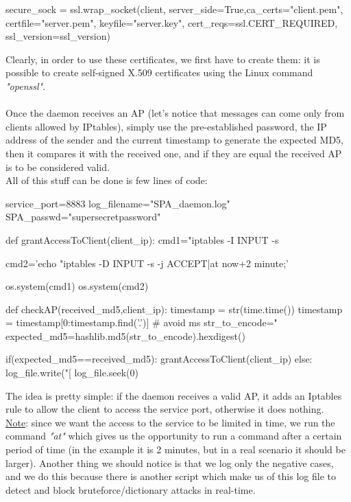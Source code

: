 \documentclass[12pt]{report}
\begin{document}
{\begin{python}
secure_sock = ssl.wrap_socket(client, server_side=True,ca_certs="client.pem",
                               certfile="server.pem",
                               keyfile="server.key",
                               cert_reqs=ssl.CERT_REQUIRED,
                               ssl_version=ssl_version)
\end{python}

\bigskip
Clearly, in order to use these certificates, we first have to create them: it is possible to create self-signed X.509 certificates using the Linux command \emph{"openssl"}.\\\\
Once the daemon receives an AP (let's notice that messages can come only from clients allowed by IPtables), simply use the pre-established password, the IP address of the sender and the current timestamp to generate the expected MD5, then it compares it with the received one, and if they are equal the received AP is to be considered valid.\\
All of this stuff can be done is few lines of code:\\

\begin{python}

service_port=8883
log_filename="SPA_daemon.log"
SPA_passwd="supersecretpassword"

def grantAccessToClient(client_ip):
	cmd1="iptables -I INPUT -s %
	
	cmd2='echo "iptables -D INPUT -s %
				-j ACCEPT|at now+2 minute;' %
				
	os.system(cmd1)
	os.system(cmd2)			        												 
				        												 
			       																							  
def checkAP(received_md5,client_ip):
	timestamp = str(time.time())
	timestamp = timestamp[0:timestamp.find('.')] # avoid ms
	str_to_encode="%
	expected_md5=hashlib.md5(str_to_encode).hexdigest()

	if(expected_md5==received_md5):
		grantAccessToClient(client_ip)
	else:
		log_file.write("[%
		log_file.seek(0)
	
\end{python}
\bigskip

The idea is pretty simple: if the daemon receives a valid AP, it adds an Iptables rule to allow the client to access the service port, otherwise it does nothing.\\
\underline{Note}: since we want the access to the service to be limited in time, we run the command \emph{"at"} which gives us the opportunity to run a command after a certain period of time (in the example it is 2 minutes, but in a real scenario it should be larger). Another thing we should notice is that we log only the negative cases, and we do this because there is another script which make us of this log file to detect and block bruteforce/dictionary attacks in real-time.\\

}
\end{document}
